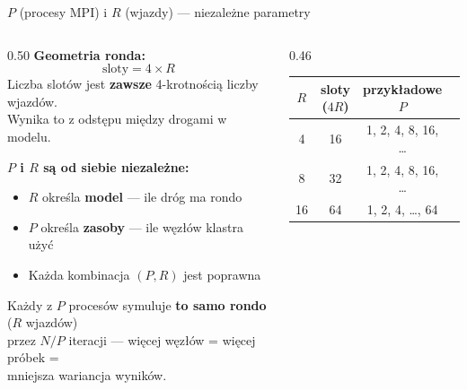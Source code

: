 \documentclass[aspectratio=169]{beamer}
\begin{document}
\begin{frame}{$P$ (procesy MPI) i $R$ (wjazdy) — niezależne parametry}
  \begin{columns}
    \begin{column}{0.50\textwidth}
      \textbf{Geometria ronda:}
      \[
        \text{sloty} = 4 \times R
      \]
      Liczba slotów jest \textbf{zawsze} 4-krotnością liczby wjazdów.\\
      Wynika to z odstępu między drogami w modelu.

      \bigskip
      \textbf{$P$ i $R$ są od siebie niezależne:}
      \begin{itemize}
        \item $R$ określa \textbf{model} — ile dróg ma rondo
        \item $P$ określa \textbf{zasoby} — ile węzłów klastra użyć
        \item Każda kombinacja $(P, R)$ jest poprawna
      \end{itemize}

      \bigskip
      Każdy z $P$ procesów symuluje \textbf{to samo rondo} ($R$ wjazdów)\\
      przez $N/P$ iteracji — więcej węzłów = więcej próbek = \\
      mniejsza wariancja wyników.
    \end{column}
    \begin{column}{0.46\textwidth}
      \begin{center}
      \begin{tabular}{cccc}
        \hline
        $R$ & sloty ($4R$) & przykładowe $P$ \\
        \hline
        4  & 16 & 1, 2, 4, 8, 16, \ldots \\
        8  & 32 & 1, 2, 4, 8, 16, \ldots \\
        16 & 64 & 1, 2, 4, \ldots, 64 \\
        \hline
      \end{tabular}
      \end{center}


\end{column}
\end{columns}
\end{frame}
\end{document}
